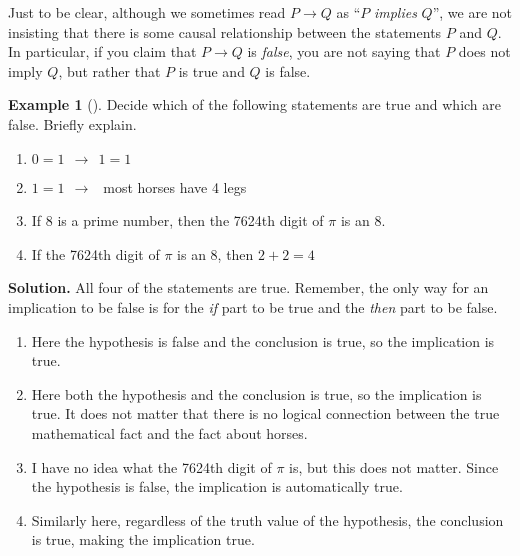 \documentclass[10pt,]{book}
\theoremstyle{plain}
\theoremstyle{definition}
\newtheorem{example}[theorem]{Example}
\theoremstyle{definition}
\theoremstyle{definition}
\numberwithin{equation}{section}
\def\imp{\rightarrow}
\begin{document}
      Just to be clear, although we sometimes read \(P \imp Q\) as ``\(P\) \emph{implies} \(Q\)'', we are not insisting that there is some causal relationship between the statements \(P\) and \(Q\). In particular, if you claim that
      \(P \imp Q\) is \emph{false}, you are not saying that \(P\) does not imply \(Q\), but rather that \(P\) is true and \(Q\) is false.
\begin{example}[]\label{example-3}
Decide which of the following statements are true and which are false. Briefly explain.
          \leavevmode%
\begin{enumerate}
\item\hypertarget{li-28}{}\(0=1 ~~ \imp ~~ 1=1\)\item\hypertarget{li-29}{}\(1=1 ~~ \imp ~~\) most horses have 4 legs\item\hypertarget{li-30}{}If 8 is a prime number, then the 7624th digit of \(\pi\) is an 8.\item\hypertarget{li-31}{}If the 7624th digit of \(\pi\) is an 8, then \(2+2 = 4\)\end{enumerate}

\par\medskip\noindent%
\textbf{Solution.}\quad 
          All four of the statements are true. Remember, the only way for an implication to be false is for the \emph{if} part to be true and the \emph{then} part to be false.
          \leavevmode%
\begin{enumerate}
\item\hypertarget{li-32}{}Here the hypothesis is false and the conclusion is true, so the implication is true. \item\hypertarget{li-33}{}Here both the hypothesis and the conclusion is true, so the implication is true. It does not matter that there is no logical connection between the true mathematical fact and the fact about horses.\item\hypertarget{li-34}{}I have no idea what the 7624th digit of \(\pi\) is, but this does not matter. Since the hypothesis is false, the implication is automatically true.\item\hypertarget{li-35}{}Similarly here, regardless of the truth value of the hypothesis, the conclusion is true, making the implication true.\end{enumerate}

\end{example}
\par
\end{document}
